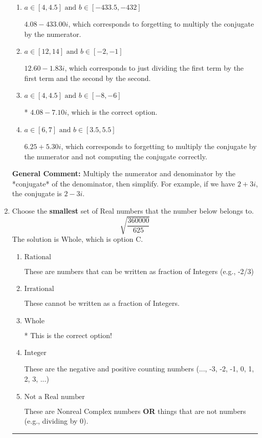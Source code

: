\documentclass{extbook}[14pt]
\newcommand{\litem}[1]{\item #1

\rule{\textwidth}{0.4pt}}
\begin{document}
\begin{enumerate}
{\begin{enumerate}[label=\Alph*.]
 $249.00  - 7.10 i$, which corresponds to forgetting to multiply the conjugate by the numerator and using a plus instead of a minus in the denominator.
\item \( a \in [4, 4.5] \text{ and } b \in [-433.5, -432] \)

 $4.08  - 433.00 i$, which corresponds to forgetting to multiply the conjugate by the numerator.
\item \( a \in [12, 14] \text{ and } b \in [-2, -1] \)

 $12.60  - 1.83 i$, which corresponds to just dividing the first term by the first term and the second by the second.
\item \( a \in [4, 4.5] \text{ and } b \in [-8, -6] \)

* $4.08  - 7.10 i$, which is the correct option.
\item \( a \in [6, 7] \text{ and } b \in [3.5, 5.5] \)

 $6.25  + 5.30 i$, which corresponds to forgetting to multiply the conjugate by the numerator and not computing the conjugate correctly.
\end{enumerate}

\textbf{General Comment:} Multiply the numerator and denominator by the *conjugate* of the denominator, then simplify. For example, if we have $2+3i$, the conjugate is $2-3i$.
}
\litem{
Choose the \textbf{smallest} set of Real numbers that the number below belongs to.
\[ \sqrt{\frac{360000}{625}} \]The solution is \( \text{Whole} \), which is option C.\begin{enumerate}[label=\Alph*.]
\item \( \text{Rational} \)

These are numbers that can be written as fraction of Integers (e.g., -2/3)
\item \( \text{Irrational} \)

These cannot be written as a fraction of Integers.
\item \( \text{Whole} \)

* This is the correct option!
\item \( \text{Integer} \)

These are the negative and positive counting numbers (..., -3, -2, -1, 0, 1, 2, 3, ...)
\item \( \text{Not a Real number} \)

These are Nonreal Complex numbers \textbf{OR} things that are not numbers (e.g., dividing by 0).
\end{enumerate}

}
\end{enumerate}
\end{document}
